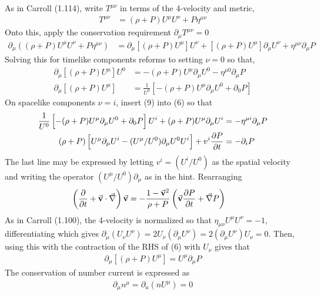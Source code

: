 \documentclass[10pt]{scrartcl}
\begin{document}
As in Carroll (1.114), write $T^{\mu\nu}$ in terms of the 4-velocity and metric,
\begin{align}
T^{\mu\nu} &= (\rho + P)U^{\mu}U^{\nu} + P\eta^{\mu\nu}	
\end{align}
Onto this, apply the conservation requirement $\partial_{\mu}T^{\mu\nu}=0$
\begin{align}
	\partial_{\mu}\left((\rho + P)U^{\mu}U^{\nu} + P\eta^{\mu\nu}\right) &= \partial_\mu[(\rho + P)U^{\mu}]U^{\nu} + [(\rho + P)U^{\mu}]\partial_\mu U^{\nu} + \eta^{\mu\nu}\partial_\mu P
\end{align}
Solving this for timelike components reforms to setting $\nu=0$ so that,
\begin{align}
\partial_\mu[(\rho + P)U^{\mu}]U^{0} &= -(\rho + P)U^{\mu}\partial_\mu U^{0} - \eta^{\mu 0}\partial_\mu P \\
\partial_\mu[(\rho + P)U^{\mu}] &= \frac{1}{U^0}\left[-(\rho + P)U^{\mu}\partial_\mu U^{0} + \partial_0 P\right]
\end{align}
On spacelike components $\nu=i$, insert (9) into (6) so that
\begin{align}
	\frac{1}{U^0}\left[-(\rho + P)U^{\mu}\partial_\mu U^{0} + \partial_0 P\right]U^i + (\rho+P)U^{\mu}\partial_{\mu}U^{i} &= -\eta^{\mu i}\partial_{\mu} P\\
	(\rho+P)\left[U^{\mu}\partial_{\mu}U^{i}-(U^{\mu}/U^0)\partial_{\mu}U^0 U^i\right]+v^i \pdv{P}{t}   &= -\partial_{i} P
\end{align}
The last line may be expressed by letting $v^i= (U^i/U^0)$ as the spatial velocity and writing the operator $(U^\mu/U^0)\partial_\mu$ as in the hint.  Rearranging 
\begin{align}
	\left(\pdv{t}+\va{v}\cdot\va{\nabla}\right) \va{v} &= -\frac{1-\va{v}^2}{\rho+P}\left(\va{v} \pdv{P}{t} + \va{\nabla} P\right)
\end{align}
As in Carroll (1.100), the 4-velocity is normalized so that $\eta_{\mu\nu}U^{\mu}U^{\nu}=-1$, differentiating which gives $\partial_{\mu}(U_{\nu}U^{\nu}) = 2U_\nu (\partial_\mu U^{\nu}) = 2 (\partial_{\mu} U^{\nu})U_{\nu}	= 0$. Then, using this with the contraction of the RHS of (6) with $U_{\nu}$ gives that 
\begin{align}
\partial_\mu[(\rho + P)U^{\mu}]= U^{\mu}\partial_\mu P  
\end{align}
The conservation of number current is expressed as
\begin{align}
\partial_{\mu}n^{\mu} = \partial_u(n U^{\mu})	= 0
\end{align}
\end{document}
